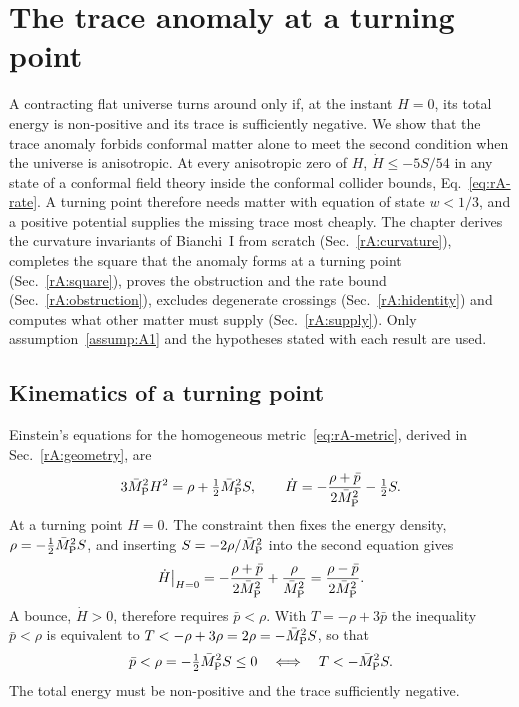 \section{The trace anomaly at a turning point}\label{rep:trace}

A contracting flat universe turns around only if, at the instant $H=0$, its total energy is non-positive and its trace is sufficiently negative.
We show that the trace anomaly forbids conformal matter alone to meet the second condition when the universe is anisotropic.
At every anisotropic zero of $H$, $\dot H\leq-5S/54$ in any state of a conformal field theory inside the conformal collider bounds, Eq.~\eqref{eq:rA-rate}. %
A turning point therefore needs matter with equation of state $w<1/3$, and a positive potential supplies the missing trace most cheaply.
The chapter derives the curvature invariants of Bianchi~I from scratch (Sec.~\ref{rA:curvature}), completes the square that the anomaly forms at a turning point (Sec.~\ref{rA:square}), proves the obstruction and the rate bound (Sec.~\ref{rA:obstruction}), excludes degenerate crossings (Sec.~\ref{rA:hidentity}) and computes what other matter must supply (Sec.~\ref{rA:supply}).
Only assumption~\ref{assump:A1} and the hypotheses stated with each result are used.

\subsection{Kinematics of a turning point}
\label{rA:kinematics}

Einstein's equations for the homogeneous metric~\eqref{eq:rA-metric}, derived in Sec.~\ref{rA:geometry}, are
\begin{equation}
3\bar M_{\mathrm{P}}^2H^2=\rho+\tfrac12\bar M_{\mathrm{P}}^2S,\qquad \dot H=-\frac{\rho+\bar p}{2\bar M_{\mathrm{P}}^2}-\tfrac12S .
\label{eq:rA-tr-einstein}
\end{equation}
At a turning point $H=0$.
The constraint then fixes the energy density, $\rho=-\tfrac12\bar M_{\mathrm{P}}^2S$, and inserting $S=-2\rho/\bar M_{\mathrm{P}}^2$ into the second equation gives
\begin{equation}
\dot H\big|_{H=0}=-\frac{\rho+\bar p}{2\bar M_{\mathrm{P}}^2}+\frac{\rho}{\bar M_{\mathrm{P}}^2}=\frac{\rho-\bar p}{2\bar M_{\mathrm{P}}^2}.
\label{eq:rA-hdot-turn}
\end{equation}
A bounce, $\dot H>0$, therefore requires $\bar p<\rho$.
With $T=-\rho+3\bar p$ the inequality $\bar p<\rho$ is equivalent to $T<-\rho+3\rho=2\rho=-\bar M_{\mathrm{P}}^2S$, so that~\cite{Solomons:2001ef}
\begin{equation}
\bar p<\rho=-\tfrac12\bar M_{\mathrm{P}}^2S\leq0\quad\Longleftrightarrow\quad T<-\bar M_{\mathrm{P}}^2S .
\label{eq:rA-trace-criterion}
\end{equation}
The total energy must be non-positive and the trace sufficiently negative.

